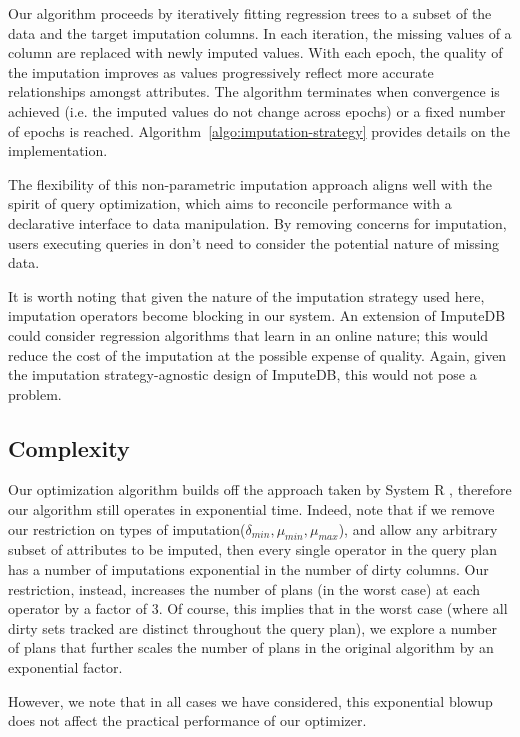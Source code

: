 Our algorithm proceeds by iteratively fitting regression trees to a subset of the data and
the target imputation columns. In each iteration, the missing values of a column are
replaced with newly imputed values. With each epoch, the quality of the imputation improves
as values progressively reflect more accurate relationships amongst attributes. The
algorithm terminates when convergence is achieved (i.e. the imputed values do not change across
epochs) or a fixed number of epochs is reached.  Algorithm~\ref{algo:imputation-strategy}
provides details on the implementation.  

The flexibility of this non-parametric imputation approach aligns well with the spirit of
query optimization, which aims to reconcile performance with a declarative interface to data
manipulation. By removing concerns for imputation, users executing queries in \ProjectName{}
don't need to consider the potential nature of missing data.

It is worth noting that given the nature of the imputation strategy used here, imputation
operators become blocking in our system. An extension of ImputeDB could consider regression
algorithms that learn in an online nature; this would reduce the cost of the imputation at
the possible expense of quality. Again, given the imputation strategy-agnostic design of
ImputeDB, this would not pose a problem.

\begin{algorithm}
    
\end{algorithm}

\subsection{Complexity}
Our optimization algorithm builds off the approach taken by System R \cite{blasgen1981system}, therefore our algorithm still operates in exponential time. Indeed, 
note that if we remove our restriction on types of imputation($\delta_{min}, \mu_{min}, \mu_{max}$), and allow any arbitrary subset of attributes to be imputed,
then every single operator in the query plan has a number of imputations exponential in the number of dirty columns. Our restriction, instead, increases the number
of plans (in the worst case) at each operator by a factor of 3. Of course, this implies that in the worst case (where all dirty sets tracked are distinct throughout the query plan),
we explore a number of plans that further scales the number of plans in the original algorithm by an exponential factor.

However, we note that in all cases we have considered, this exponential blowup does not affect the practical performance of our optimizer.

